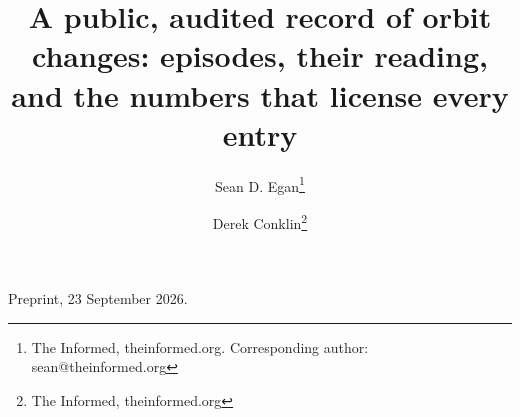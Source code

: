 \documentclass[11pt]{article}
\begin{document}
\title{A public, audited record of orbit changes: episodes, their reading, and the numbers that license every entry}
\author{Sean D. Egan\thanks{The Informed, theinformed.org. Corresponding author: sean@theinformed.org}
  \and Derek Conklin\thanks{The Informed, theinformed.org}}
\date{}
\maketitle


Preprint, 23 September 2026.

\end{document}
